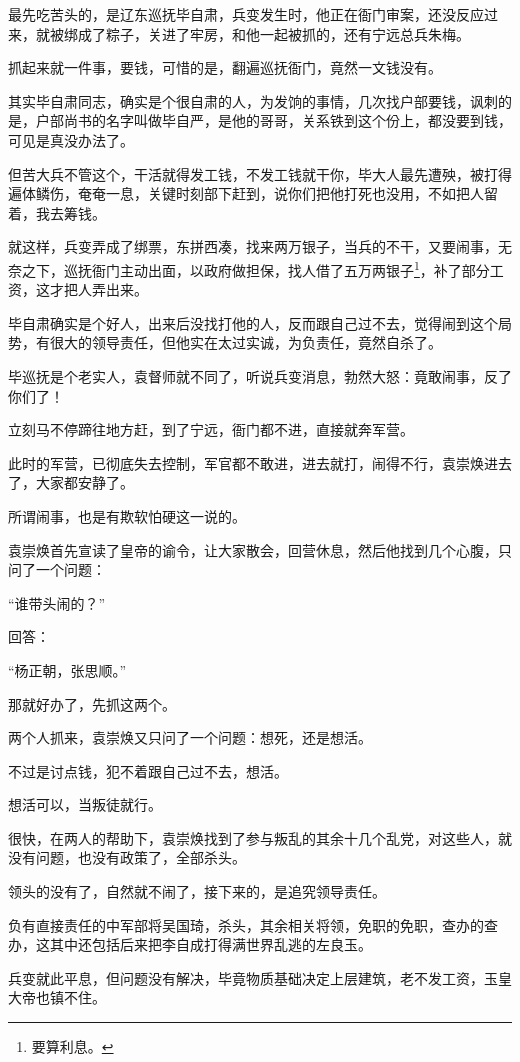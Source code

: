 \begin{multicols}{\theparacolNo}
最先吃苦头的，是辽东巡抚毕自肃，兵变发生时，他正在衙门审案，还没反应过来，就被绑成了粽子，关进了牢房，和他一起被抓的，还有宁远总兵朱梅。

抓起来就一件事，要钱，可惜的是，翻遍巡抚衙门，竟然一文钱没有。

其实毕自肃同志，确实是个很自肃的人，为发饷的事情，几次找户部要钱，讽刺的是，户部尚书的名字叫做毕自严，是他的哥哥，关系铁到这个份上，都没要到钱，可见是真没办法了。

但苦大兵不管这个，干活就得发工钱，不发工钱就干你，毕大人最先遭殃，被打得遍体鳞伤，奄奄一息，关键时刻部下赶到，说你们把他打死也没用，不如把人留着，我去筹钱。

就这样，兵变弄成了绑票，东拼西凑，找来两万银子，当兵的不干，又要闹事，无奈之下，巡抚衙门主动出面，以政府做担保，找人借了五万两银子\footnote{要算利息。}，补了部分工资，这才把人弄出来。

毕自肃确实是个好人，出来后没找打他的人，反而跟自己过不去，觉得闹到这个局势，有很大的领导责任，但他实在太过实诚，为负责任，竟然自杀了。

毕巡抚是个老实人，袁督师就不同了，听说兵变消息，勃然大怒：竟敢闹事，反了你们了！

立刻马不停蹄往地方赶，到了宁远，衙门都不进，直接就奔军营。

此时的军营，已彻底失去控制，军官都不敢进，进去就打，闹得不行，袁崇焕进去了，大家都安静了。

所谓闹事，也是有欺软怕硬这一说的。

袁崇焕首先宣读了皇帝的谕令，让大家散会，回营休息，然后他找到几个心腹，只问了一个问题：

“谁带头闹的？”

回答：

“杨正朝，张思顺。”

那就好办了，先抓这两个。

两个人抓来，袁崇焕又只问了一个问题：想死，还是想活。

不过是讨点钱，犯不着跟自己过不去，想活。

想活可以，当叛徒就行。

很快，在两人的帮助下，袁崇焕找到了参与叛乱的其余十几个乱党，对这些人，就没有问题，也没有政策了，全部杀头。

领头的没有了，自然就不闹了，接下来的，是追究领导责任。

负有直接责任的中军部将吴国琦，杀头，其余相关将领，免职的免职，查办的查办，这其中还包括后来把李自成打得满世界乱逃的左良玉。

兵变就此平息，但问题没有解决，毕竟物质基础决定上层建筑，老不发工资，玉皇大帝也镇不住。


\end{multicols}
